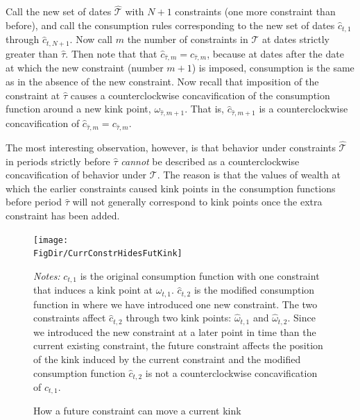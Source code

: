 \documentclass[titlepage]{\econtex}
\providecommand{\wAlt}{\omega}
\begin{document}
  Call the new set of dates $\hat{\mathcal{T}}$ with $N+1$ constraints (one more constraint than before), and call the consumption rules corresponding to the new set of dates
  $\hat{c}_{t,1}$ through $\hat{c}_{t,N+1}$. Now call $m$ the
  number of constraints in $\mathcal{T}$ at dates strictly
  greater than $\hat{\tau}$.  Then note that that $\hat{c}_{\hat{\tau},m} =
  c_{\hat{\tau},m}$, because at dates after the date at which the new constraint (number $m+1$) is
  imposed, consumption is the same as in the absence of the new constraint.
  Now recall that imposition of the constraint at $\hat{\tau}$ causes a counterclockwise concavification of the consumption function around a new kink point, $\wAlt_{\hat{\tau},m+1}$. That is, $\hat{c}_{\hat{\tau},m+1}$ is a counterclockwise concavification of $\hat{c}_{\hat{\tau},m} = c_{\hat{\tau},m}$.

  The most interesting observation, however, is that behavior under constraints $\hat{\mathcal{T}}$ in periods strictly before $\hat{\tau}$ \textit{cannot} be described as a counterclockwise concavification of behavior under $\mathcal{T}$.  The reason is that the values of wealth at which the earlier constraints caused kink points in the consumption functions before period $\hat{\tau}$ will not generally correspond to kink points once the extra constraint has been added.

  \hypertarget{CurrConstrHidesFutKink}{}

  \begin{figure}[ht]
    {\centering \texttt{[image: \\FigDir/CurrConstrHidesFutKink]}}
    \caption{How a future constraint can move a current kink}
    \footnotesize {\emph{Notes:} $c_{t,1}$ is the original consumption function with one constraint that induces a kink point at $\omega_{t,1}$. $\hat{c}_{t,2}$ is the modified consumption function in where we have introduced one new constraint. The two constraints affect $\hat{c}_{t,2}$ through two kink points: $\hat{\omega}_{t,1}$ and $\hat{\omega}_{t,2}$. Since we introduced the new constraint at a later point in time than the current existing constraint, the future constraint affects the position of the kink induced by the current constraint and the modified consumption function $\hat{c}_{t,2}$ is not a counterclockwise concavification of ${c}_{t,1}$.}
    \label{fig:LCtHidesLCtpn}
  \end{figure}
\end{document}
